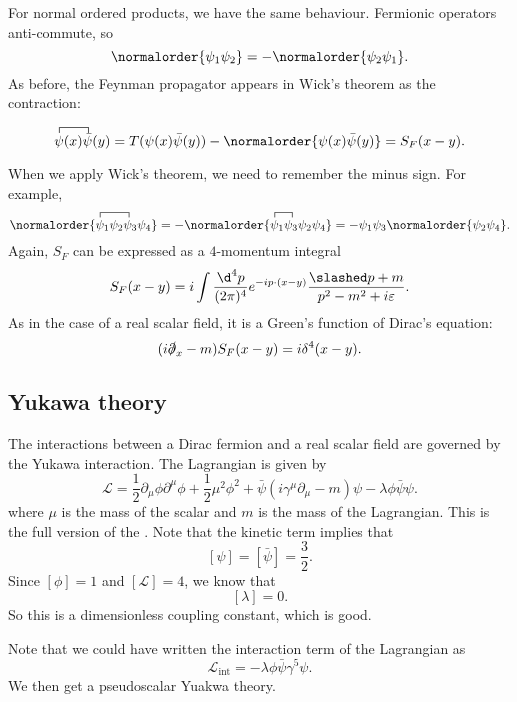 \documentclass[a4paper]{article}
\begin{document}
For normal ordered products, we have the same behaviour. Fermionic operators anti-commute, so
\[
  \normalorder{\psi_1\psi_2} = - \normalorder{\psi_2\psi_1}.
\]
As before, the Feynman propagator appears in Wick's theorem as the contraction:
\begin{prop}
  \[
    \contraction{}{\psi}{(x)}{\bar\psi}\psi(x) \bar\psi(y) = T(\psi(x) \bar\psi(y)) - \normalorder{\psi(x) \bar\psi(y)} = S_F(x - y).
  \]
\end{prop}
When we apply Wick's theorem, we need to remember the minus sign. For example,
\[
  \normalorder{\contraction{}{\psi}{_1\psi_2}{\psi}\psi_1 \psi_2\psi_3\psi_4} = -\normalorder{\contraction{}{\psi}{_1}{\psi_3}\psi_1\psi_3 \psi_2\psi_4} = -\psi_1 \psi_3 \normalorder{\psi_2 \psi_4}.
\]
Again, $S_F$ can be expressed as a $4$-momentum integral
\[
  S_F(x - y) = i \int \frac{\d^4 p}{(2\pi)^4} e^{-ip\cdot (x - y)} \frac{\slashed p + m}{p^2 - m^2 + i \varepsilon}.
\]
As in the case of a real scalar field, it is a Green's function of Dirac's equation:
\[
  (i \slashed\partial_x - m) S_F(x - y) = i \delta^4(x - y).
\]

\subsection{Yukawa theory}
The interactions between a Dirac fermion and a real scalar field are governed by the Yukawa interaction. The Lagrangian is given by
\[
  \mathcal{L} = \frac{1}{2}\partial_\mu \phi \partial^\mu \phi + \frac{1}{2} \mu^2 \phi^2 + \bar\psi (i \gamma^\mu \partial_\mu - m) \psi - \lambda \phi \bar\psi \psi.
\]
where $\mu$ is the mass of the scalar and $m$ is the mass of the Lagrangian. This is the full version of the . Note that the kinetic term implies that
\[
  [\psi] = [\bar\psi] = \frac{3}{2}.
\]
Since $[\phi] = 1$ and $[\mathcal{L}] = 4$, we know that
\[
  [\lambda] = 0.
\]
So this is a dimensionless coupling constant, which is good.

Note that we could have written the interaction term of the Lagrangian as
\[
  \mathcal{L}_{\mathrm{int}} =- \lambda \phi \bar\psi \gamma^5 \psi.
\]
We then get a pseudoscalar Yuakwa theory.
\end{document}
